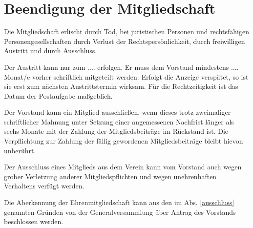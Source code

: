 \documentclass{article}
\begin{document}
\section{Beendigung der Mitgliedschaft}
\begin{absatz}
    \item Die Mitgliedschaft erlischt durch Tod, bei juristischen Personen und rechtsfähigen Personengesellschaften durch Verlust der Rechtspersönlichkeit, durch freiwilligen Austritt und durch Ausschluss.
    \item Der Austritt kann nur zum
    .... erfolgen. Er muss dem Vorstand mindestens .... Monat/e vorher schriftlich mitgeteilt werden. Erfolgt die Anzeige verspätet, so ist sie erst zum nächsten Austrittstermin wirksam. Für die Rechtzeitigkeit ist das Datum der Postaufgabe maßgeblich.
    \item Der Vorstand kann ein Mitglied ausschließen, wenn dieses trotz zweimaliger schriftlicher Mahnung unter Setzung einer angemessenen Nachfrist länger als sechs Monate mit der Zahlung der Mitgliedsbeiträge im Rückstand ist. Die Verpflichtung zur Zahlung der fällig gewordenen Mitgliedsbeiträge bleibt hievon unberührt.
    \item \label{ausschluss} Der Ausschluss eines Mitglieds aus dem Verein kann vom Vorstand auch wegen grober Verletzung anderer Mitgliedspflichten und wegen unehrenhaften Verhaltens verfügt werden.
    \item Die Aberkennung der Ehrenmitgliedschaft kann aus den im Abs. \ref{ausschluss} genannten Gründen von der Generalversammlung über Antrag des Vorstands beschlossen werden.
\end{absatz}
\end{document}
